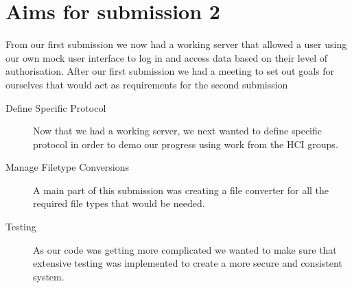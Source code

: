 \section{Aims for submission 2}
From our first submission we now had a working server that allowed a user using our own mock user interface to log in and access data based on their level of authorisation. After our first submission we had a meeting to set out goals for ourselves that would act as requirements for the second submission
\begin{description}
  \item[Define Specific Protocol] Now that we had a working server, we next wanted to define specific protocol in order to demo our progress using work from the HCI groups.
  \item[Manage Filetype Conversions] A main part of this submission was creating a file converter for all the required file types that would be needed.
  \item[Testing] As our code was getting more complicated we wanted to make sure that extensive testing was implemented to create a more secure and consistent system.
\end{description}
